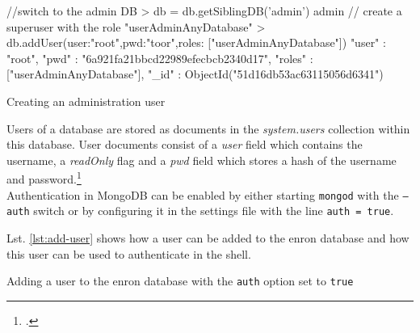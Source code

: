 \begin{listing}
    \begin{javascriptcode}
//switch to the admin DB
> db = db.getSiblingDB('admin')
admin
// create a superuser with the role "userAdminAnyDatabase"
> db.addUser({user:"root",pwd:"toor",roles: ["userAdminAnyDatabase"]})
{
	"user" : "root",
	"pwd" : "6a921fa21bbcd22989efecbcb2340d17",
	"roles" : ["userAdminAnyDatabase"],
	"_id" : ObjectId("51d16db53ac63115056d6341")
}
    \end{javascriptcode}
    \caption{Creating an administration user}
    \label{lst:mongo-root}
\end{listing}

Users of a database are stored as documents in the \textit{system.users} collection
within this database.
User documents consist of a \textit{user} field which contains the username,
a \textit{readOnly} flag and a \textit{pwd} field which stores a hash of the
username and password.\footcite[Cf.][]{mongo_adduser}\\
Authentication in MongoDB can be enabled by either starting \texttt{mongod} with
the \texttt{--auth} switch or by configuring it in the settings file with the
line \texttt{auth = true}.

Lst. \ref{lst:add-user}
shows how a user can be added to the enron database and how this user
can be used to authenticate in the shell.

\begin{listing}
    \caption[Adding a user to the enron database]{Adding a user to the enron
    database with the \texttt{auth} option set to \texttt{true}}
    \label{lst:add-user}
\end{listing}


